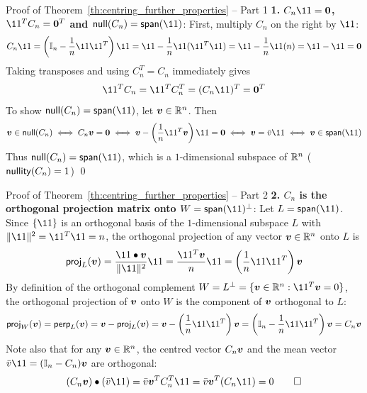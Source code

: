 \documentclass[aspectratio=169]{beamer}\usepackage[]{graphicx}\usepackage[]{xcolor}
\begin{document}
\begin{frame}{Proof of Theorem~\ref{th:centring_further_properties} -- Part 1}
\textbf{1. $C_n\11 = \b0$, $\11^T C_n = \b0^T$ and $\nullspace(C_n) = \Span(\11)$}:
\vfill
First, multiply $C_n$ on the right by $\11$:
\[
C_n\11 = \left(\II_n - \frac{1}{n}\11\11^T\right)\11 = \11 - \frac{1}{n}\11(\11^T\11) = \11 - \frac{1}{n}\11(n) = \11 - \11 = \b0
\]
Taking transposes and using $C_n^T = C_n$ immediately gives
\[
\11^T C_n = \11^T C_n^T = (C_n\11)^T = \b0^T
\]
\vfill
To show $\nullspace(C_n) = \Span(\11)$, let $\bm{v}\in\mathbb{R}^n$. Then
\[
\bv\in\nullspace(C_n) \iff C_n\bv = \b0 \iff \bv - \left(\frac{1}{n}\11^T\bv\right)\11 = \b0 \iff \bv = \bar{v}\11 \iff \bv\in\Span(\11)
\]
Thus $\nullspace(C_n) = \Span(\11)$, which is a $1$-dimensional subspace of $\mathbb{R}^n$ ($\mathsf{nullity}(C_n) = 1$) \hfill\qed
\end{frame}

\begin{frame}{Proof of Theorem~\ref{th:centring_further_properties} -- Part 2}
\textbf{2. $C_n$ is the orthogonal projection matrix onto $W = \Span(\11)^\perp$}:
\vfill
Let $L = \Span(\11)$. Since $\{\11\}$ is an orthogonal basis of the $1$-dimensional subspace $L$ with $\|\11\|^2 = \11^T\11 = n$, the orthogonal projection of any vector $\bm{v}\in\mathbb{R}^n$ onto $L$ is
\[
\mathsf{proj}_L(\bv) = \frac{\11\bullet\bv}{\|\11\|^2}\11 = \frac{\11^T\bv}{n}\11 = \left(\frac{1}{n}\11\11^T\right)\bv
\]
\vfill
By definition of the orthogonal complement $W = L^\perp = \{\bv\in\IR^n : \11^T\bv = 0\}$, the orthogonal projection of $\bm{v}$ onto $W$ is the component of $\bm{v}$ orthogonal to $L$:
\[
\mathsf{proj}_W(\bv) = \mathsf{perp}_L(\bv) = \bv - \mathsf{proj}_L(\bv) = \bv - \left(\frac{1}{n}\11\11^T\right)\bv = \left(\II_n - \frac{1}{n}\11\11^T\right)\bv = C_n\bv
\]
\vfill
Note also that for any $\bm{v}\in\mathbb{R}^n$, the centred vector $C_n\bm{v}$ and the mean vector $\bar{v}\11 = (\II_n - C_n)\bv$ are orthogonal:
\[
(C_n\bv)\bullet(\bar{v}\11) = \bar{v}\bv^T C_n^T\11 = \bar{v}\bv^T(C_n\11) = 0 \hfill\qed
\]
\end{frame}
\end{document}

